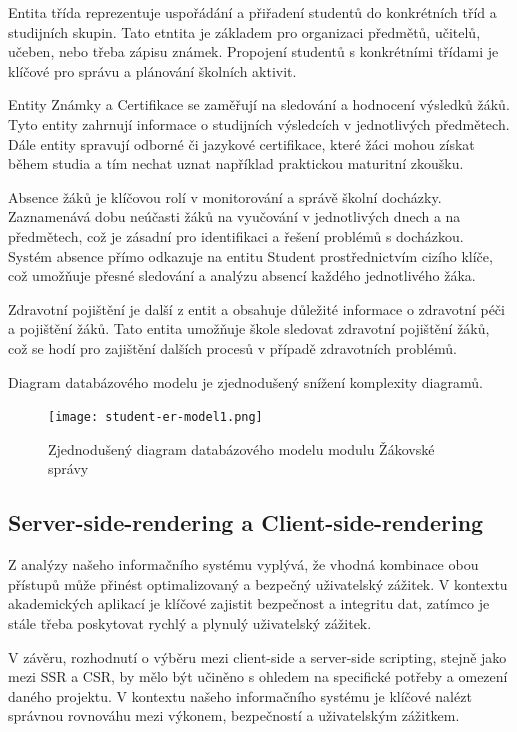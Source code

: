 \documentclass[FM,Proj]{tulthesis}
\begin{document}
Entita třída reprezentuje uspořádání a přiřadení studentů do konkrétních tříd a 
studijních skupin. Tato etntita je základem pro organizaci předmětů, učitelů,
učeben, nebo třeba zápisu známek. Propojení studentů s konkrétními třídami je 
klíčové pro správu a plánování školních aktivit.

Entity Známky a Certifikace se zaměřují na sledování a hodnocení 
výsledků žáků. Tyto entity zahrnují informace o studijních výsledcích v
jednotlivých předmětech. Dále entity spravují odborné či jazykové certifikace,
které žáci mohou získat během studia a tím nechat uznat například praktickou
maturitní zkoušku.

Absence žáků je klíčovou rolí v monitorování a správě školní docházky. 
Zaznamenává dobu neúčasti žáků na vyučování v jednotlivých dnech a na 
předmětech, což je zásadní pro identifikaci a řešení problémů s docházkou.
Systém absence přímo odkazuje na entitu Student prostřednictvím cizího klíče,
což umožňuje přesné sledování a analýzu absencí každého jednotlivého žáka.

Zdravotní pojištění je další z entit a obsahuje důležité informace o zdravotní
péči a pojištění žáků. Tato entita umožňuje škole sledovat zdravotní pojištění
žáků, což se hodí pro zajištění dalších procesů v případě zdravotních
problémů.

Diagram databázového modelu je zjednodušený snížení komplexity diagramů.
\begin{figure}[H]
    \texttt{[image: student-er-model1.png]}
    \caption{Zjednodušený diagram databázového modelu modulu Žákovské správy}
    \label{fig:student-er-model}
\end{figure}


\subsection*{Server-side-rendering a Client-side-rendering}

Z analýzy našeho informačního systému vyplývá, že vhodná kombinace obou přístupů může 
přinést optimalizovaný a bezpečný uživatelský zážitek. V kontextu akademických aplikací
je klíčové zajistit bezpečnost a integritu dat, zatímco je stále třeba poskytovat 
rychlý a plynulý uživatelský zážitek.

V závěru, rozhodnutí o výběru mezi client-side a server-side scripting,
stejně jako mezi SSR a CSR, by mělo být učiněno s ohledem na specifické potřeby a omezení 
daného projektu. V kontextu našeho informačního systému je klíčové nalézt správnou 
rovnováhu mezi výkonem, bezpečností a uživatelským zážitkem.
\end{document}
